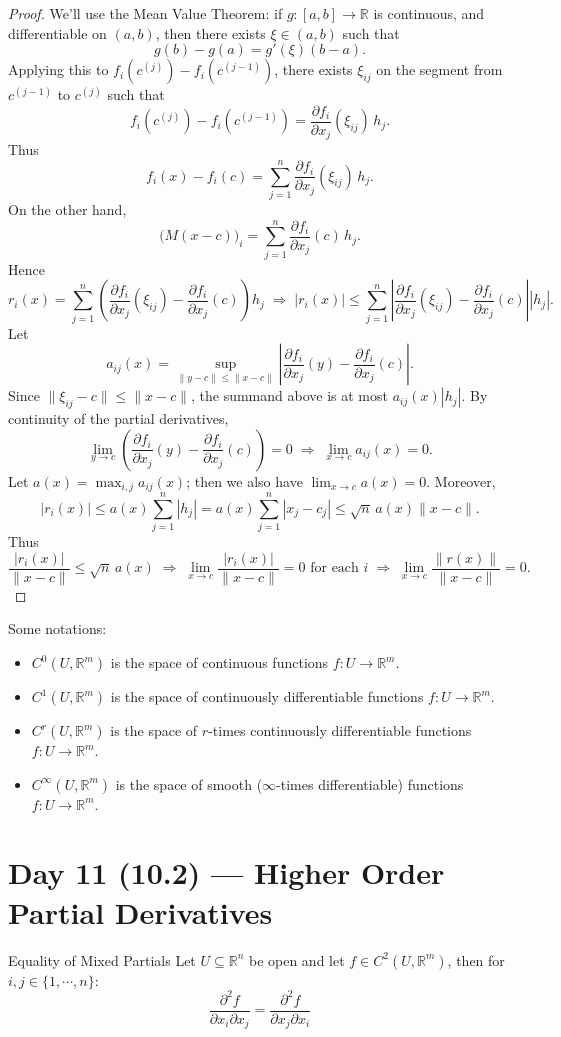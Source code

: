 \documentclass[11pt]{article}
\newenvironment{theorem}[1]{\begin{thmbox}{#1}{}}{\end{thmbox}}
\theoremstyle{quiet}
\theoremstyle{quietremark}
\begin{document}
\begin{proof}
We'll use the Mean Value Theorem: if $g:[a,b]\to\mathbb{R}$ is continuous, and differentiable on $(a,b)$, then there exists $\xi\in(a,b)$ such that
\[
g(b)-g(a)=g'(\xi)(b-a).
\]
Applying this to $f_i(c^{(j)})-f_i(c^{(j-1)})$, there exists $\xi_{ij}$ on the segment from $c^{(j-1)}$ to $c^{(j)}$ such that
\[
f_i(c^{(j)})-f_i(c^{(j-1)})=\frac{\partial f_i}{\partial x_j}(\xi_{ij})\,h_j.
\]
Thus
\[
f_i(x)-f_i(c)=\sum_{j=1}^n\frac{\partial f_i}{\partial x_j}(\xi_{ij})\,h_j.
\]
On the other hand,
\[
\bigl(M(x-c)\bigr)_i=\sum_{j=1}^n\frac{\partial f_i}{\partial x_j}(c)\,h_j.
\]
Hence
\[
r_i(x)=\sum_{j=1}^n\left(\frac{\partial f_i}{\partial x_j}(\xi_{ij})-\frac{\partial f_i}{\partial x_j}(c)\right)h_j
\;\Rightarrow\;
|r_i(x)|\le\sum_{j=1}^n\left|\frac{\partial f_i}{\partial x_j}(\xi_{ij})-\frac{\partial f_i}{\partial x_j}(c)\right||h_j|.
\]
Let
\[
a_{ij}(x)=\sup_{\|y-c\|\le\|x-c\|}\left|\frac{\partial f_i}{\partial x_j}(y)-\frac{\partial f_i}{\partial x_j}(c)\right|.
\]
Since $\|\xi_{ij}-c\|\le\|x-c\|$, the summand above is at most $a_{ij}(x)|h_j|$. By continuity of the partial derivatives,
\[
\lim_{y\to c}\left(\frac{\partial f_i}{\partial x_j}(y)-\frac{\partial f_i}{\partial x_j}(c)\right)=0
\;\Rightarrow\;
\lim_{x\to c}a_{ij}(x)=0.
\]
Let $a(x)=\max_{i,j}a_{ij}(x)$; then we also have $\lim_{x\to c}a(x)=0$. Moreover,
\[
|r_i(x)|\le a(x)\sum_{j=1}^n|h_j|=a(x)\sum_{j=1}^n|x_j-c_j|\le \sqrt{n}\,a(x)\|x-c\|.
\]
Thus
\[
\frac{|r_i(x)|}{\|x-c\|}\le \sqrt{n}\,a(x)
\;\Rightarrow\;
\lim_{x\to c}\frac{|r_i(x)|}{\|x-c\|}=0 \text{ for each } i
\;\Rightarrow\;
\lim_{x\to c}\frac{\|r(x)\|}{\|x-c\|}=0.
\]
\end{proof}

Some notations:
\begin{itemize}
\item $C^0(U,\mathbb{R}^m)$ is the space of continuous functions $f:U\to\mathbb{R}^m$.
\item $C^1(U,\mathbb{R}^m)$ is the space of continuously differentiable functions $f:U\to\mathbb{R}^m$.
\item $C^r(U,\mathbb{R}^m)$ is the space of $r$-times continuously differentiable functions $f:U\to\mathbb{R}^m$.
\item $C^\infty(U,\mathbb{R}^m)$ is the space of smooth ($\infty$-times differentiable) functions $f:U\to\mathbb{R}^m$.
\end{itemize}

\newpage
\section{Day 11 (10.2) --- Higher Order Partial Derivatives}
\begin{theorem}{Equality of Mixed Partials}
Let $U\subseteq\mathbb{R}^n$ be open and let $f\in C^2(U,\mathbb{R}^m)$, then for $i,j\in\{1,\cdots,n\}$:
\[
\frac{\partial^2 f}{\partial x_i\partial x_j}=\frac{\partial^2 f}{\partial x_j\partial x_i}
\]
\end{theorem}
\end{document}
